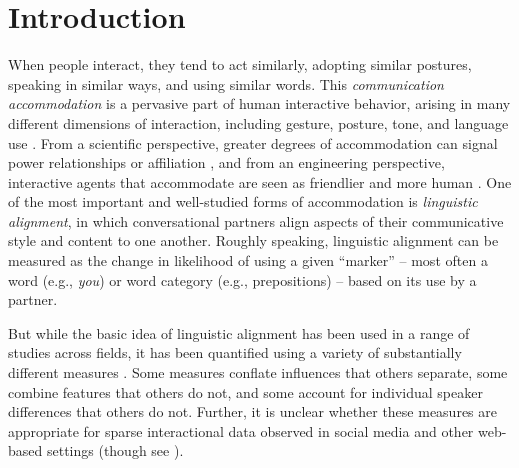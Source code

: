 \documentclass{acm_proc_article-sp}
\begin{document}



\section{Introduction}

When people interact, they tend to act similarly, adopting similar postures, speaking in similar ways, and using similar words. This \textit{communication accommodation} \cite{GilesCouplandCoupland1991} is a pervasive part of human interactive behavior, arising in many different dimensions of interaction, including gesture, posture, tone, and language use \cite{CondonOgston1967,BourhisGiles1977,GilesSchererTaylor1979,LeveltKelter1982,HaleBurgoon1984,ChartrandvanBaaren2009}. From a scientific perspective, greater degrees of accommodation can signal power relationships or affiliation \cite{WillemynsEtAl1997,Gnisci2005,DNMEtAl2012}, and from an engineering perspective, interactive agents that accommodate are seen as friendlier and more human \cite{NassLee2000}.  One of the most important and well-studied forms of accommodation is \textit{linguistic alignment}, in which conversational partners align aspects of their communicative style and content to one another. Roughly speaking, linguistic alignment can be measured as the change in likelihood of using a given ``marker'' -- most often a word (e.g., \textit{you}) or word category (e.g., prepositions) -- based on its use by a partner. 

But while the basic idea of linguistic alignment has been used in a range of studies across fields, it has been quantified using a variety of substantially different measures \cite{IrelandEtAl2011,DNMGamonDumais2011,FusaroliEtAl2012}. Some measures conflate influences that others separate, some combine features that others do not, and some account for individual speaker differences that others do not. Further, it is unclear whether these measures are appropriate for sparse interactional data observed in social media and other web-based settings (though see \cite{XuReitter2015}).  
\end{document}
